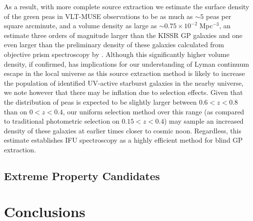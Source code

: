 \documentclass[fleqn,usenatbib]{mnras}
\begin{document}
As a result, with more complete source extraction we estimate the surface density of the green peas in VLT-MUSE observations to be as much as $\sim5$ peas per square arcminute, and a volume density as large as $\sim 0.75\times 10^{-2}\;$Mpc$^{-3}$, an estimate three orders of magnitude larger than the KISSR GP \cite{brunker_2020} galaxies and one even larger than the preliminary density of these galaxies calculated from objective prism spectroscopy by \cite{salzer2009}.  Although this significantly higher volume density, if confirmed, has implications for our understanding of Lyman continuum escape in the local universe as this source extraction method is likely to increase the population of identified UV-active starburst galaxies in the nearby universe, we note however that there may be inflation due to selection effects. Given that the distribution of peas is expected to be slightly larger between $0.6<z<0.8$ than on $0<z<0.4$, our uniform selection method over this range (as compared to traditional photometric selection on $0.15<z<0.4$)  may sample an increased density of these galaxies at earlier times closer to cosmic noon. Regardless, this estimate establishes IFU spectroscopy as a highly efficient method for blind GP extraction.
 

\subsection{Extreme Property Candidates}

\section{Conclusions}
\label{sec:conc}
\end{document}
